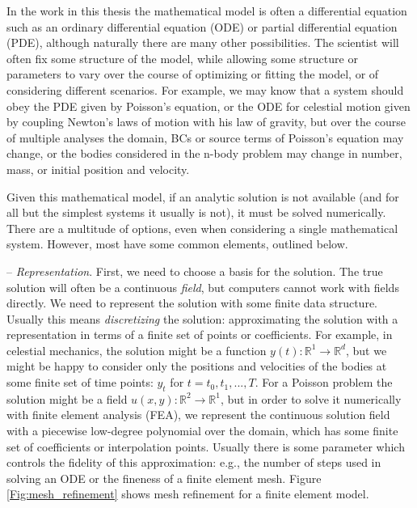 \documentclass{puthesis}
\begin{document}
In the work in this thesis the mathematical model is often a differential equation
such as an ordinary differential equation (ODE) or partial differential equation
(PDE), although naturally there are many other possibilities. The scientist will often
fix some structure of the model, while allowing some structure or parameters to vary
over the course of optimizing or fitting the model, or of considering different
scenarios. For example, we may know that a system should obey the PDE
given by Poisson's equation, or the ODE for celestial motion given by coupling Newton's
laws of motion with his law of gravity, but over the course of multiple analyses the
domain, BCs or source terms of Poisson's equation may change,
or the bodies considered in the n-body problem may
change in number, mass, or initial position and velocity.

Given this mathematical model, if an analytic solution is not available
(and for all but the simplest systems it usually is not),
it must be solved numerically. There are a multitude of options, even when considering
a single mathematical system. However, most have some common elements, outlined below.


-- \emph{Representation}. First, we need to choose a basis for the solution.
The true solution will often be a
continuous \emph{field}, but computers cannot work with fields directly. We need to
represent the solution with some finite data structure. Usually this means
\emph{discretizing} the solution: approximating the solution with a representation in
terms of a finite set of points or coefficients. For example, in celestial mechanics,
the solution might be a function $y(t): \mathbb{R}^1 \to \mathbb{R}^d$, but we might be happy
to consider only the positions and velocities of the bodies at some finite set of
time points: $y_t$ for $t = t_0, t_1, ..., T$. For a Poisson problem the solution
might be a field $u(x, y): \mathbb{R}^2 \to \mathbb{R}^1$, but in order to solve it
numerically with finite element analysis (FEA), we represent the continuous solution
field with a piecewise low-degree polynomial over the domain, which has some finite
set of coefficients or interpolation points.
Usually there is some parameter which controls the fidelity of this approximation: e.g.,
the number of steps used in solving an ODE or the fineness of a finite element mesh.
Figure \ref{Fig:mesh_refinement} shows mesh refinement for a finite element model.
\end{document}
